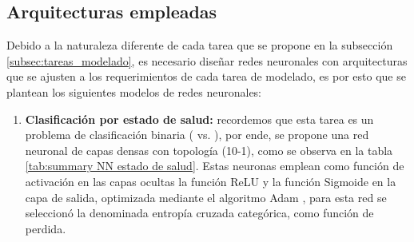 \documentclass[12pt,letterpaper,oneside,openright]{book}
\begin{document}
\subsection{Arquitecturas empleadas}

Debido a la naturaleza diferente de cada tarea que se propone en la subsección \ref{subsec:tareas_modelado}, es necesario diseñar redes neuronales con arquitecturas que se ajusten a los requerimientos de cada tarea de modelado, es por esto que se plantean los siguientes modelos de redes neuronales:
\begin{enumerate}
	\item \textbf{Clasificación por estado de salud:} recordemos que esta tarea es un problema de clasificación binaria ( vs. ), por ende, se propone una red neuronal de capas densas con topología (10-1), como se observa en la tabla \ref{tab:summary NN estado de salud}. Estas neuronas emplean como función de activación en las capas ocultas la función ReLU y la función Sigmoide en la capa de salida, optimizada mediante el algoritmo Adam \cite{adamoptimization14}, para esta red se seleccionó la denominada entropía cruzada categórica, como función de perdida. 
	

\end{enumerate}
\end{document}
